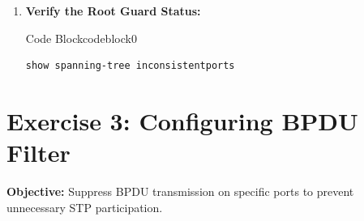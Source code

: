 \documentclass[a4paper]{book}
\begin{document}
\begin{enumerate}
	\item \textbf{Verify the Root Guard Status:}



	      \begin{ocg}{Code Block}{codeblock}{0}
		      \vspace{0.5cm}
		      \begin{lstlisting}
show spanning-tree inconsistentports
                \end{lstlisting}
	      \end{ocg}
\end{enumerate}





\section*{Exercise 3: Configuring BPDU Filter}

\textbf{Objective:} Suppress BPDU transmission on specific ports to prevent unnecessary STP participation.
\end{document}
